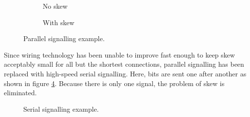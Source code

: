 		\begin{figure}
			\begin{subfigure}[b]{0.49\textwidth}
				\center
				
				\caption{No skew}
				\label{fig:parallel-example-no-skew}
			\end{subfigure}
			\begin{subfigure}[b]{0.49\textwidth}
				\center
				
				\caption{With skew}
				\label{fig:parallel-example-skew}
			\end{subfigure}
			
			\caption{Parallel signalling example.}
			\label{fig:parallel-example}
		\end{figure}
		
		Since wiring technology has been unable to improve fast enough to keep
		skew acceptably small for all but the shortest connections, parallel
		signalling has been replaced with high-speed serial signalling.  Here,
		bits are sent one after another as shown in figure
		\ref{fig:serial-example}. Because there is only one signal, the problem of
		skew is eliminated.
		
		\begin{figure}
			\center
			\begin{tikzpicture}
				
			\end{tikzpicture}
			
			\caption{Serial signalling example.}
			\label{fig:serial-example}
		\end{figure}
